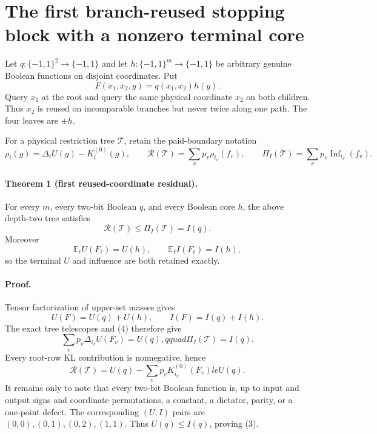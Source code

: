 \section*{The first branch-reused stopping block with a nonzero terminal core}

Let \(q:\{-1,1\}^2\to\{-1,1\}\) and let
\(h:\{-1,1\}^m\to\{-1,1\}\) be arbitrary genuine Boolean functions on
disjoint coordinates.  Put
\[
 F(x_1,x_2,y)=q(x_1,x_2)h(y).                         \tag{1}
\]
Query \(x_1\) at the root and query the same physical coordinate \(x_2\)
on both children.  Thus \(x_2\) is reused on incomparable branches but
never twice along one path.  The four leaves are \(\pm h\).

For a physical restriction tree \(\mathcal T\), retain the paid-boundary
notation
\[
 \rho_i(g)=\Delta_iU(g)-K_i^{(0)}(g),\qquad
 \mathcal R(\mathcal T)=\sum_vp_v\rho_{i_v}(f_v),
 \qquad
 \Pi_I(\mathcal T)=\sum_vp_v\operatorname{Inf}_{i_v}(f_v).             \tag{2}
\]

\paragraph{Theorem 1 (first reused-coordinate residual).}
For every \(m\), every two-bit Boolean \(q\), and every Boolean core \(h\),
the above depth-two tree satisfies
\[
 \boxed{\mathcal R(\mathcal T)\le\Pi_I(\mathcal T)=I(q).}             \tag{3}
\]
Moreover
\[
 \mathbb E_\ell U(F_\ell)=U(h),\qquad
 \mathbb E_\ell I(F_\ell)=I(h),                                     \tag{4}
\]
so the terminal \(U\) and influence are both retained exactly.

\paragraph{Proof.}
Tensor factorization of upper-set masses gives
\[
 U(F)=U(q)+U(h),\qquad I(F)=I(q)+I(h).                                \tag{5}
\]
The exact tree telescopes and (4) therefore give
\[
 \sum_vp_v\Delta_{i_v}U(F_v)=U(q),qquad
 \Pi_I(\mathcal T)=I(q).                                               \tag{6}
\]
Every root-row KL contribution is nonnegative, hence
\[
 \mathcal R(\mathcal T)
 =U(q)-\sum_vp_vK_{i_v}^{(0)}(F_v)le U(q).                            \tag{7}
\]
It remains only to note that every two-bit Boolean function is, up to input
and output signs and coordinate permutations, a constant, a dictator,
parity, or a one-point defect.  The corresponding \((U,I)\) pairs are
\((0,0),(0,1),(0,2),(1,1)\).  Thus \(U(q)\le I(q)\), proving (3).

